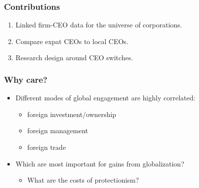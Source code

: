 \documentclass[aspectratio=169,compress,mathserif]{beamer}
\newcounter{ora}
\begin{document}
\begin{frame}\frametitle{Contributions}\hypertarget{Contributions}{}
\begin{enumerate}\setcounter{enumi}{0}
\item Linked firm-CEO data for the universe of corporations.

\item Compare expat CEOs to local CEOs.

\item Research design around CEO switches.


\end{enumerate}
\end{frame}



\begin{frame}\frametitle{Why care?}\hypertarget{Why care?}{}
\begin{itemize}
\item Different modes of global engagement are highly correlated:
\begin{itemize}
\item foreign investment/ownership

\item foreign management

\item foreign trade
\end{itemize}

\item Which are most important for gains from globalization?
\begin{itemize}
\item What are the costs of protectionism?


\end{itemize}







\end{itemize}
\end{frame}
\end{document}
